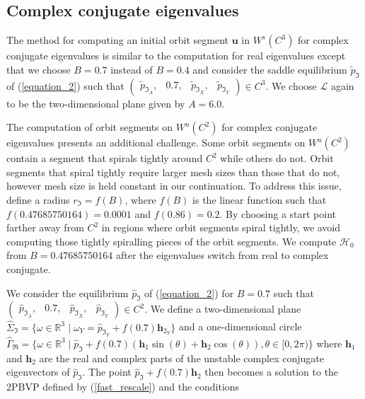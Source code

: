 \documentclass{ws-ijbc}
\begin{document}
\subsection{Complex conjugate eigenvalues}

The method for computing an initial orbit segment $\mathbf{u}$ in $W^{s}(C^3)$ for complex conjugate eigenvalues is similar to the computation for real eigenvalues except that we choose $B=0.7$ instead of $B=0.4$ and consider the saddle equilibrium $\tilde{p}_{\Im}$ of (\ref{equation_2}) such that $\begin{pmatrix}\tilde{p}_{\Im_A}, &0.7, &\tilde{p}_{\Im_X}, &\tilde{p}_{\Im_Y} \end{pmatrix} \in C^3$.  We choose $\mathscr{L}$ again to be the two-dimensional plane given by $A=6.0$.

The computation of orbit segments on $W^u(C^2)$ for complex conjugate eigenvalues presents an additional challenge.  Some orbit segments on $W^u(C^2)$ contain a segment that spirals tightly around $C^2$ while others do not.  Orbit segments that spiral tightly require larger mesh sizes than those that do not, however mesh size is held constant in our continuation.  To address this issue, define a radius $r_{\Im} =  f(B)$, where $f(B)$ is the linear function such that $f(0.47685750164)=0.0001$ and $f(0.86)=0.2$.  By choosing a start point farther away from $C^2$ in regions where orbit segments spiral tightly, we avoid computing those tightly spiralling pieces of the orbit segments.  We compute $\mathscr{H}_0$ from $B=0.47685750164$ after the eigenvalues switch from real to complex conjugate.

We consider the equilibrium $\hat{p}_{\Im}$ of (\ref{equation_2}) for $B=0.7$ such that $\begin{pmatrix} \hat{p}_{\Im_A},& 0.7,&\hat{p}_{\Im_X},&\hat{p}_{\Im_Y} \end{pmatrix} \in C^2$.  We define a two-dimensional plane $\widehat{\Sigma}_{\Im} = \{ \omega \in \mathbb{R}^3  \; | \; \omega_Y = \hat{p}_{\Im_Y} + f(0.7) \mathbf{h}_{2_Y} \}$ and a one-dimensional circle $\widehat{\Gamma}_{\Re}= \{ \omega \in \mathbb{R}^3  \; | \; \hat{p}_{\Im} + f(0.7)(\mathbf{h}_1\sin(\theta) + \mathbf{h}_2\cos(\theta)), \theta \in [0,2\pi) \}$  where $\mathbf{h}_1$ and $\mathbf{h}_2$ are the real and complex parts of the unstable complex conjugate eigenvectors of $\hat{p}_{\Im}$.  The point $\hat{p}_{\Im} + f(0.7)\mathbf{h}_2$ then becomes a solution to the 2PBVP defined by (\ref{fast_rescale}) and the conditions
\end{document}
